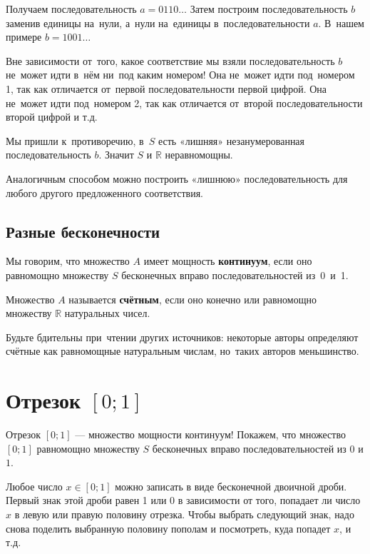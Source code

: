 \documentclass[12pt, a4paper]{article}
\def \N{\ensuremath{\mathbb{R}{ }}}
\begin{document}
Получаем последовательность $a=0110\ldots$ Затем построим последовательность $b$ заменив единицы на~нули, а~нули на~единицы в~последовательности $a$. В~нашем примере $b=1001\ldots $

Вне зависимости от~того, какое соответствие мы взяли  последовательность $b$ не~может идти в~нём ни~под каким номером! Она не~может идти под~номером 1, так как отличается от~первой последовательности первой цифрой. Она не~может идти под~номером 2, так как отличается от~второй последовательности второй цифрой и т.д.

Мы пришли к~противоречию, в~$S$ есть «лишняя» незанумерованная последовательность $b$. Значит $S$ и $\N$ неравномощны.

Аналогичным способом можно построить «лишнюю» последовательность для любого другого предложенного соответствия.

\subsection{Разные бесконечности}

Мы говорим, что множество $A$ имеет мощность \textbf{континуум}, если оно равномощно множеству $S$ бесконечных вправо последовательностей из~0~и~1.


Множество $A$ называется \textbf{счётным}, если оно конечно или равномощно множеству $\N$ натуральных чисел.

Будьте бдительны при~чтении других источников: некоторые авторы определяют счётные как равномощные натуральным числам, но~таких авторов меньшинство.

\section{Отрезок $[0;1]$}

Отрезок $[0;1]$ --- множество мощности континуум!
Покажем, что множество $[0;1]$ равномощно множеству $S$ бесконечных вправо последовательностей из $0$ и $1$.

Любое число $x \in [0;1]$ можно записать в виде бесконечной двоичной дроби. Первый знак этой дроби равен 1 или 0 в зависимости от того, попадает ли число $x$ в левую или правую половину отрезка. Чтобы выбрать следующий знак, надо снова поделить выбранную половину пополам и посмотреть, куда попадет $x$, и т.д.
\end{document}
